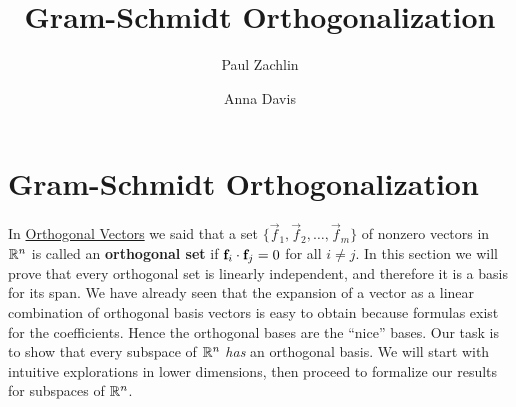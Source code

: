 \documentclass{ximera}
\author{Paul Zachlin \and Anna Davis} \title{Gram-Schmidt Orthogonalization} \license{CC-BY 4.0}
\begin{document}
\begin{abstract}

\end{abstract}
\maketitle

\section*{Gram-Schmidt Orthogonalization}
In \href{https://ximera.osu.edu/oerlinalg/LinearAlgebra/RTH-0010/main}{Orthogonal Vectors} we said that a set $\{ \vec{f}_1, \vec{f}_2, \dots, \vec{f}_m\}$ of nonzero vectors in $\mathbb{R}^n$ is called an \textbf{orthogonal set} if $\mathbf{f}_i \cdot \mathbf{f}_j =0$ for all $i \neq j$.  In this section we will prove that every orthogonal set is linearly independent, and therefore it is a basis for its span.  We have already seen that the expansion of a vector as a linear combination of orthogonal basis vectors is easy to obtain because formulas exist for the coefficients.  Hence the orthogonal bases are the ``nice'' bases. %
Our task is to show that every subspace of $\mathbb{R}^n$ \textit{has} an orthogonal basis.  We will start with intuitive explorations in lower dimensions, then proceed to formalize our results for subspaces of $\mathbb{R}^n$.
\end{document}
